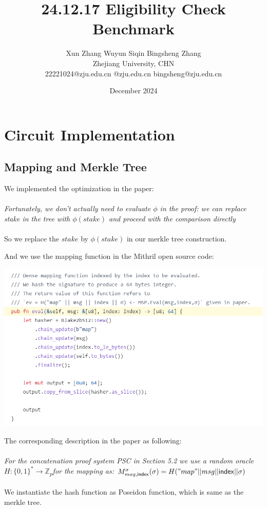\documentclass{article}
\title{24.12.17 Eligibility Check Benchmark}
\author{Xun Zhang \quad \quad Wuyun Siqin \quad \quad Bingsheng Zhang \\
Zhejiang University, CHN \\
22221024@zju.edu.cn \quad 3210101763@zju.edu.cn \quad bingsheng@zju.edu.cn}
\date{December 2024}
\begin{document}
\maketitle

\section{Circuit Implementation}

\subsection{Mapping and Merkle Tree}

We implemented the optimization in the paper:
\\
\\
\textit{Fortunately,
we don’t actually need to evaluate $\phi$ in the proof: we can replace stake in the tree with $\phi(stake)$ and proceed with the comparison directly}
\\
\\
So we replace the $stake$ by $\phi(stake)$ in our merkle tree construction.


And we use the mapping function in the Mithril open source code:

\includegraphics[width=1\linewidth]{mithril-mapping-code.png}


The corresponding description in the paper as following:
\\
\\
\textit{For the concatenation proof system PSC in Section 5.2 we use a random oracle
$H: \{0,1\}^* \rightarrow \mathbb{Z}_p $for the mapping as: $M_{mag,\mathsf{index}}^\sigma(\sigma)= H("map"||msg||\mathsf{index}||\sigma)$}
\\
\\
We instantiate the hash function as Poseidon function, which is same as the merkle tree.
\end{document}
